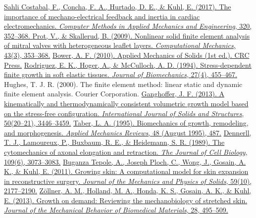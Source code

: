 \documentclass[10pt,letterpaper,oneside]{report}
\begin{document}
\begin{itemize}
\begin{thebibliography}{99}
\href{http://doi.org/10.1016/j.cma.2017.03.015}{%
Sahli Costabal, F., Concha, F. A., Hurtado, D. E., \& Kuhl, E. (2017). The importance of mechano-electrical feedback and inertia in cardiac electromechanics. \textit{Computer Methods in Applied Mechanics and Engineering}, 320, 352–368. }
%
\href{http://doi.org/10.1007/s00466-008-0310-2}{%
Prot, V., \& Skallerud, B. (2009). Nonlinear solid finite element analysis of mitral valves with heterogeneous leaflet layers. \textit{Computational Mechanics}, 43(3), 353–368.}
%
\href{http://solidmechanics.org/}{%
Bower, A. F. (2010). Applied Mechanics of Solids (1st ed.). CRC Press.}
%
\href{http://doi.org/10.1016/0021-9290(94)90021-3}{%
Rodriguez, E. K., Hoger, A., \& McCulloch, A. D. (1994). Stress-dependent finite growth in soft elastic tissues. \textit{Journal of Biomechanics}, 27(4), 455–467.}
%
Hughes, T. J. R. (2000). The finite element method: linear static and dynamic finite element analysis. Courier Corporation.
%
\href{http://doi.org/10.1016/j.ijsolstr.2013.06.011}{%
Ganghoffer, J. F. (2013). A kinematically and thermodynamically consistent volumetric growth model based on the stress-free configuration. \textit{International Journal of Solids and Structures}, 50(20–21), 3446–3459.}
%
\href{http://adsabs.harvard.edu/abs/1995ApMRv..48..487T}{%
Taber, L. A. (1995). Biomechanics of growth, remodeling, and morphogenesis. \textit{Applied Mechanics Reviews}, 48 (August 1995), 487.}
%
\href{http://jcb.rupress.org/content/109/6/3073.abst}{%
Dennerll, T. J., Lamoureux, P., Buxbaum, R. E., \& Heidemann, S. R. (1989). The cytomechanics of axonal elongation and retraction. \textit{The Journal of Cell Biology}, 109(6), 3073–3083.}
%
\href{http://doi.org/10.1016/j.jmps.2011.05.004}{%
Buganza Tepole, A., Joseph Ploch, C., Wong, J., Gosain, A. K., \& Kuhl, E. (2011). Growing skin: A computational model for skin expansion in reconstructive surgery. \textit{Journal of the Mechanics and Physics of Solids}, 59(10), 2177–2190.}
%
\href{http://doi.org/10.1016/j.jmbbm.2013.03.018}{%
Zöllner, A. M., Holland, M. A., Honda, K. S., Gosain, A. K., \& Kuhl, E. (2013). Growth on demand: Reviewing the mechanobiology of stretched skin. \textit{Journal of the Mechanical Behavior of Biomedical Materials}, 28, 495–509.}
%
\href{http://doi.org/10.1016/j.jmps.2010.07.003}{%
}
\end{thebibliography}
\end{itemize}
\end{document}
